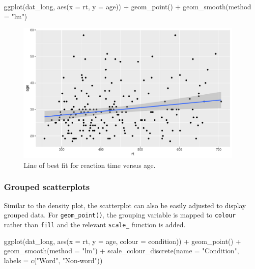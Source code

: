 \documentclass[
  english,
  doc,floatsintext]{apa6}
\newenvironment{Shaded}{\begin{snugshade}}{\end{snugshade}}
\newcommand{\AttributeTok}[1]{\textcolor[rgb]{0.77,0.63,0.00}{#1}}
\newcommand{\FunctionTok}[1]{\textcolor[rgb]{0.00,0.00,0.00}{#1}}
\newcommand{\NormalTok}[1]{#1}
\newcommand{\SpecialCharTok}[1]{\textcolor[rgb]{0.00,0.00,0.00}{#1}}
\newcommand{\StringTok}[1]{\textcolor[rgb]{0.31,0.60,0.02}{#1}}
\begin{document}
\begin{Shaded}
\begin{Highlighting}[]
\FunctionTok{ggplot}\NormalTok{(dat\_long, }\FunctionTok{aes}\NormalTok{(}\AttributeTok{x =}\NormalTok{ rt, }\AttributeTok{y =}\NormalTok{ age)) }\SpecialCharTok{+}
  \FunctionTok{geom\_point}\NormalTok{() }\SpecialCharTok{+}
  \FunctionTok{geom\_smooth}\NormalTok{(}\AttributeTok{method =} \StringTok{"lm"}\NormalTok{)}
\end{Highlighting}
\end{Shaded}

\begin{figure}

{\centering \includegraphics[width=1\linewidth]{images/smooth-plot-1} 

}

\caption{Line of best fit for reaction time versus age.}\label{fig:smooth-plot}
\end{figure}

\hypertarget{grouped-scatterplots}{%
\subsubsection{Grouped scatterplots}\label{grouped-scatterplots}}

Similar to the density plot, the scatterplot can also be easily adjusted to display grouped data. For \texttt{geom\_point()}, the grouping variable is mapped to \texttt{colour} rather than \texttt{fill} and the relevant \texttt{scale\_} function is added.

\begin{Shaded}
\begin{Highlighting}[]
\FunctionTok{ggplot}\NormalTok{(dat\_long, }\FunctionTok{aes}\NormalTok{(}\AttributeTok{x =}\NormalTok{ rt, }\AttributeTok{y =}\NormalTok{ age, }\AttributeTok{colour =}\NormalTok{ condition)) }\SpecialCharTok{+}
  \FunctionTok{geom\_point}\NormalTok{() }\SpecialCharTok{+}
  \FunctionTok{geom\_smooth}\NormalTok{(}\AttributeTok{method =} \StringTok{"lm"}\NormalTok{) }\SpecialCharTok{+}
  \FunctionTok{scale\_colour\_discrete}\NormalTok{(}\AttributeTok{name =} \StringTok{"Condition"}\NormalTok{,}
                      \AttributeTok{labels =} \FunctionTok{c}\NormalTok{(}\StringTok{"Word"}\NormalTok{, }\StringTok{"Non{-}word"}\NormalTok{))}
\end{Highlighting}
\end{Shaded}
\end{document}
